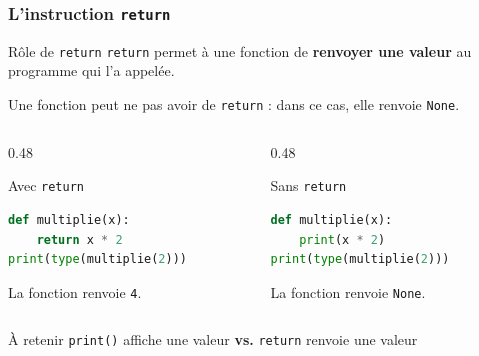 \documentclass[10pt]{beamer}
\begin{document}
\begin{frame}[containsverbatim]
	\frametitle{L'instruction \texttt{return}}
	
	\begin{block}{Rôle de \texttt{return}}
		\texttt{return} permet à une fonction de \textbf{renvoyer une valeur}
		au programme qui l'a appelée.
		
		\vspace{0.05cm}
		
		Une fonction peut ne pas avoir de \texttt{return} :
		dans ce cas, elle renvoie \texttt{None}.
	\end{block}
	
	\vspace{0.15cm}
	
	\begin{columns}[T]
		\begin{column}{0.48\textwidth}
			\begin{exampleblock}{Avec \texttt{return}}
\begin{lstlisting}[language=Python]
def multiplie(x):
	return x * 2
print(type(multiplie(2)))
\end{lstlisting}
				
				\centering
				La fonction renvoie \texttt{4}.
			\end{exampleblock}
		\end{column}
		
		\begin{column}{0.48\textwidth}
			\begin{exampleblock}{Sans \texttt{return}}
\begin{lstlisting}[language=Python]
def multiplie(x):
	print(x * 2)
print(type(multiplie(2)))
\end{lstlisting}
				
				\centering
				La fonction renvoie \texttt{None}.
			\end{exampleblock}
		\end{column}
	\end{columns}
	
	\vspace{0.1cm}
	
	\begin{alertblock}{À retenir}
		\centering
		\texttt{print()} affiche une valeur \qquad
		\textbf{vs.} \qquad
		\texttt{return} renvoie une valeur
	\end{alertblock}
	
\end{frame}
\end{document}

